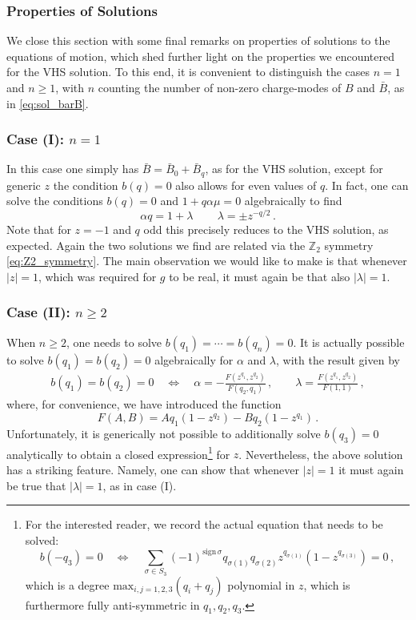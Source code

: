 \documentclass[11pt,a4paper]{article}
\numberwithin{equation}{section}
\numberwithin{table}{section}\setlength{\multlinegap}{25pt}
\begin{document}
\subsubsection{Properties of Solutions}

We close this section with some final remarks on properties of solutions to the equations of motion, which shed further light on the properties we encountered for the VHS solution. To this end, it is convenient to distinguish the cases $n=1$ and $n\geq 1$, with $n$ counting the number of non-zero charge-modes of $B$ and $\bar{B}$, as in \eqref{eq:sol_barB}.

\subsubsection*{Case (I): $n=1$}

In this case one simply has $\bar{B} = \bar{B}_0 + \bar{B}_q$, as for the VHS solution, except for generic $z$ the condition $b(q)=0$ also allows for even values of $q$. In fact, one can solve the conditions $b(q)=0$ and $1+q\alpha\mu=0$ algebraically to find
\begin{equation}
	\alpha q = 1+\lambda\,\qquad \lambda = \pm z^{-q/2}\,.
\end{equation}
Note that for $z=-1$ and $q$ odd this precisely reduces to the VHS solution, as expected. Again the two solutions we find are related via the $\mathbb{Z}_2$ symmetry \eqref{eq:Z2_symmetry}. The main observation we would like to make is that whenever $|z|=1$, which was required for $g$ to be real, it must again be that also $|\lambda| =1$.

\subsubsection*{Case (II): $n\geq 2$}

When $n\geq 2$, one needs to solve $b(q_1)=\cdots=b(q_n)=0$. It is actually possible to solve $b(q_1)=b(q_2)=0$ algebraically for $\alpha$ and $\lambda$, with the result given by
\begin{align}
	b(q_1)=b(q_2)=0\quad\iff\quad \alpha = -\frac{F(z^{q_1},z^{q_2})}{F(q_2,q_1)}\,,\qquad \lambda  = \frac{F(z^{q_1},z^{q_2})}{F(1,1)}\,,
\end{align}
where, for convenience, we have introduced the function
\begin{equation}
	F(A,B) = A q_1(1-z^{q_2})-B q_2 (1-z^{q_1})\,.
\end{equation}
Unfortunately, it is generically not possible to additionally solve $b(q_3)=0$ analytically to obtain a closed expression\footnote{For the interested reader, we record the actual equation that needs to be solved:
\begin{equation*}
b(-q_3)=0\quad\iff\quad	\sum_{\sigma\in S_3} (-1)^{\mathrm{sign}\,\sigma} q_{\sigma(1)}q_{\sigma(2)} z^{q_{\sigma(1)}}\left(1-z^{q_{\sigma(3)}}\right) = 0\,,
\end{equation*}
which is a degree $\mathrm{max}_{i,j=1,2,3}(q_i+q_j)$ polynomial in $z$, which is furthermore fully anti-symmetric in $q_1,q_2,q_3$.} for $z$. Nevertheless, the above solution has a striking feature. Namely, one can show that whenever $|z|=1$ it must again be true that $|\lambda|=1$, as in case (I). 
\end{document}
